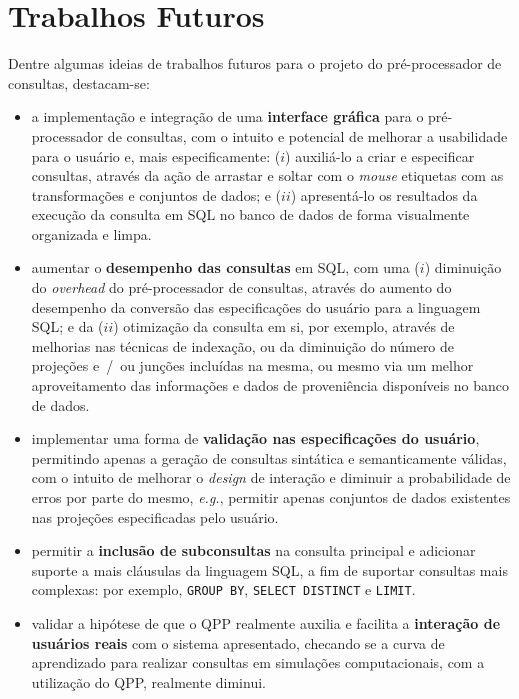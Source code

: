 \section{Trabalhos Futuros}

Dentre algumas ideias de trabalhos futuros para o projeto do pré-processador de consultas, destacam-se:

\begin{itemize}
    \item a implementação e integração de uma \textbf{interface gráfica} para o pré-processador de consultas, com o intuito e potencial de melhorar a usabilidade para o usuário e, mais especificamente: (\(i\)) auxiliá-lo a criar e especificar consultas, através da ação de arrastar e soltar com o \textit{mouse} etiquetas com as transformações e conjuntos de dados; e (\(ii\)) apresentá-lo os resultados da execução da consulta em SQL no banco de dados de forma visualmente organizada e limpa.
    \item aumentar o \textbf{desempenho das consultas} em SQL, com uma (\(i\)) diminuição do \textit{overhead} do pré-processador de consultas, através do aumento do desempenho da conversão das especificações do usuário para a linguagem SQL; e da (\(ii\)) otimização da consulta em si, por exemplo, através de melhorias nas técnicas de indexação, ou da diminuição do número de projeções e~/~ou junções incluídas na mesma, ou mesmo via um melhor aproveitamento das informações e dados de proveniência disponíveis no banco de dados.
    \item implementar uma forma de \textbf{validação nas especificações do usuário}, permitindo apenas a geração de consultas sintática e semanticamente válidas, com o intuito de melhorar o \textit{design} de interação e diminuir a probabilidade de erros por parte do mesmo, \textit{e.g.}, permitir apenas conjuntos de dados existentes nas projeções especificadas pelo usuário.
    \item permitir a \textbf{inclusão de subconsultas} na consulta principal e adicionar suporte a mais cláusulas da linguagem SQL, a fim de suportar consultas mais complexas: por exemplo, \texttt{GROUP BY}, \texttt{SELECT DISTINCT} e \texttt{LIMIT}.
    \item validar a hipótese de que o QPP realmente auxilia e facilita a \textbf{interação de usuários reais} com o sistema apresentado, checando se a curva de aprendizado para realizar consultas em simulações computacionais, com a utilização do QPP, realmente diminui.
\end{itemize}
